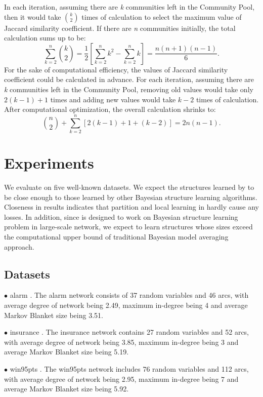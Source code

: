In each iteration, assuming there are \emph{k} communities left in the Community Pool, then it would take $\binom{k}{2}$ times of calculation to select the maximum value of Jaccard similarity coefficient. If there are \emph{n} communities initially, the total calculation sums up to be:
\[\sum_{k=2}^{n}\binom{k}{2}=\frac{1}{2}[\sum_{k=2}^{n} k^{2}-\sum_{k=2}^{n}k]=\frac{n(n+1)(n-1)}{6}.\]
For the sake of computational efficiency, the values of Jaccard similarity coefficient could be calculated in advance. For each iteration, assuming there are \emph{k} communities left in the Community Pool, removing old values would take only $2(k-1)+1$ times and adding new values would take $k-2$ times of calculation. After computational optimization, the overall calculation shrinks to:
\[\binom{n}{2}+\sum_{k=2}^{n}[2(k-1)+1+(k-2)]=2n(n-1).\]


\section{Experiments}
\label{experiments}

We evaluate \lama{} on five well-known datasets. We expect the structures learned by \lama{} to be close enough to those learned by other Bayesian structure learning algorithms. Closeness in results indicates that partition and local learning in \lama{} hardly cause any losses. In addition, since \lama{} is designed to work on Bayesian structure learning problem in large-scale network, we expect \lama{} to learn structures whose sizes exceed the computational upper bound of
traditional Bayesian model averaging approach.


\subsection{Datasets}
\label{exp:dataset}

$\bullet$ alarm \cite{alarm}. The alarm network consists of 37 random variables and 46 arcs, with average degree of network being 2.49, maximum in-degree being 4 and average Markov Blanket size being 3.51.

$\bullet$ insurance \cite{insurance}. The insurance network contains 27 random variables and 52 arcs, with average degree of network being 3.85, maximum in-degree being 3 and average Markov Blanket size being 5.19.

$\bullet$ win95pts \cite{win95pts}. The win95pts network includes 76 random variables and 112 arcs, with average degree of network being 2.95, maximum in-degree being 7 and average Markov Blanket size being 5.92.

